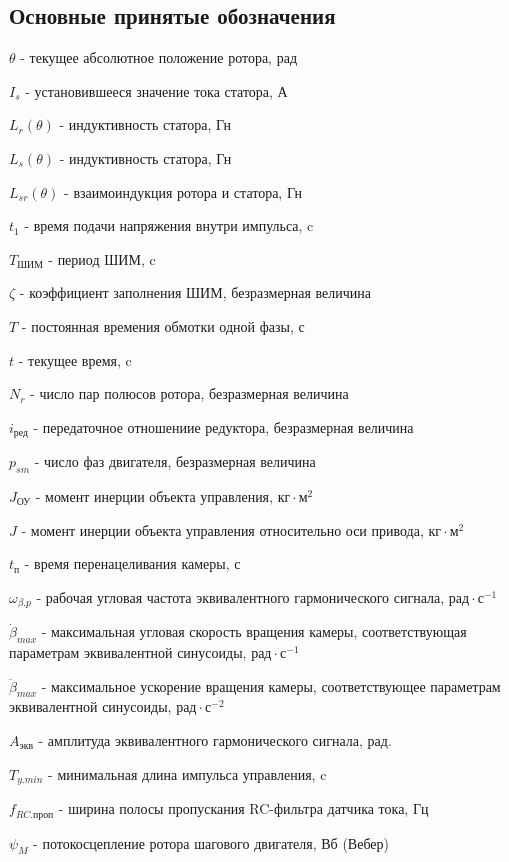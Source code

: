 \subsection{ Основные принятые обозначения }

$\theta$ - текущее абсолютное положение ротора, рад

$I_{s}$ - установившееся значение тока статора, А

$L_{r}(\theta)$ - индуктивность статора, Гн

$L_{s}(\theta)$ - индуктивность статора, Гн

$L_{sr}(\theta)$ - взаимоиндукция ротора и статора, Гн

$t_{1}$ - время подачи напряжения внутри импульса, c

$T_\text{ШИМ}$ - период ШИМ, c

$\zeta$ - коэффициент заполнения ШИМ, безразмерная величина

$T$ - постоянная времения обмотки одной фазы, с

$t$ - текущее время, c

$N_{r}$ - число пар полюсов ротора, безразмерная величина

$i_\text{ред}$ - передаточное отношениие редуктора, безразмерная величина

$p_{sm}$ - число фаз двигателя, безразмерная величина

$J_{\text{ОУ}}$ - момент инерции объекта управления, $ \text{кг} \cdot \text{м}^{2} $

$J$ - момент инерции объекта управления относительно оси привода, $ \text{кг} \cdot \text{м}^{2} $

$t_\text{п}$ - время перенацеливания камеры, с

$\omega_{\beta.p}$ - рабочая угловая частота эквивалентного гармонического сигнала,
                     $ \text{рад} \cdot \text{с}^{-1} $

$\dot{\beta}_{max}$ - максимальная угловая скорость вращения камеры, соответствующая
                      параметрам эквивалентной синусоиды, $ \text{рад} \cdot \text{с}^{-1} $

$\ddot{\beta}_{max}$ - максимальное ускорение вращения камеры, соответствующее
                       параметрам эквивалентной синусоиды, $ \text{рад} \cdot \text{с}^{-2} $

$A_\text{экв}$ - амплитуда эквивалентного гармонического сигнала, рад.

$T_{y.min}$ - минимальная длина импульса управления, c

$f_{RC.\text{проп} }$ - ширина полосы пропускания RC-фильтра датчика тока, Гц

$\psi_{M}$ - потокосцепление ротора шагового двигателя, Вб (Вебер)

